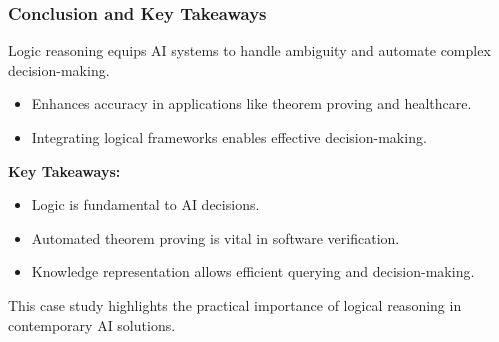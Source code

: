 \documentclass[aspectratio=169]{beamer}
\begin{document}
\begin{frame}[fragile]
    \frametitle{Conclusion and Key Takeaways}
    Logic reasoning equips AI systems to handle ambiguity and automate complex decision-making.
    \begin{itemize}
        \item Enhances accuracy in applications like theorem proving and healthcare.
        \item Integrating logical frameworks enables effective decision-making.
    \end{itemize}
    
    \textbf{Key Takeaways:}
    \begin{itemize}
        \item Logic is fundamental to AI decisions.
        \item Automated theorem proving is vital in software verification.
        \item Knowledge representation allows efficient querying and decision-making.
    \end{itemize}
    
    This case study highlights the practical importance of logical reasoning in contemporary AI solutions.
\end{frame}
\end{document}
